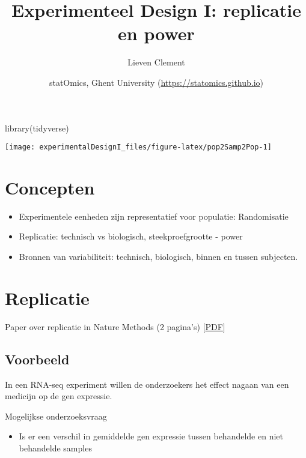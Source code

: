 \documentclass[
]{article}
\title{Experimenteel Design I: replicatie en power}
\author{Lieven Clement}
\date{statOmics, Ghent University (\url{https://statomics.github.io})}
\newenvironment{Shaded}{\begin{snugshade}}{\end{snugshade}}
\newcommand{\FunctionTok}[1]{\textcolor[rgb]{0.00,0.00,0.00}{#1}}
\newcommand{\NormalTok}[1]{#1}
\providecommand{\tightlist}{%
  \setlength{\itemsep}{0pt}\setlength{\parskip}{0pt}}
\begin{document}
\maketitle

{
\setcounter{tocdepth}{2}
\tableofcontents
}
\begin{Shaded}
\begin{Highlighting}[]
\FunctionTok{library}\NormalTok{(tidyverse)}
\end{Highlighting}
\end{Shaded}

\begin{center}\texttt{[image: experimentalDesignI\_files/figure-latex/pop2Samp2Pop-1]} \end{center}

\hypertarget{concepten}{%
\section{Concepten}\label{concepten}}

\begin{itemize}
\tightlist
\item
  Experimentele eenheden zijn representatief voor populatie:
  Randomisatie
\item
  Replicatie: technisch vs biologisch, steekproefgrootte - power
\item
  Bronnen van variabiliteit: technisch, biologisch, binnen en tussen
  subjecten.
\end{itemize}

\hypertarget{replicatie}{%
\section{Replicatie}\label{replicatie}}

Paper over replicatie in Nature Methods (2 pagina's)
{[}\href{https://www.nature.com/articles/nmeth.3091.pdf}{PDF}{]}

\hypertarget{voorbeeld}{%
\subsection{Voorbeeld}\label{voorbeeld}}

In een RNA-seq experiment willen de onderzoekers het effect nagaan van
een medicijn op de gen expressie.

Mogelijkse onderzoeksvraag

\begin{itemize}
\tightlist
\item
  Is er een verschil in gemiddelde gen expressie tussen behandelde en
  niet behandelde samples
\end{itemize}
\end{document}
